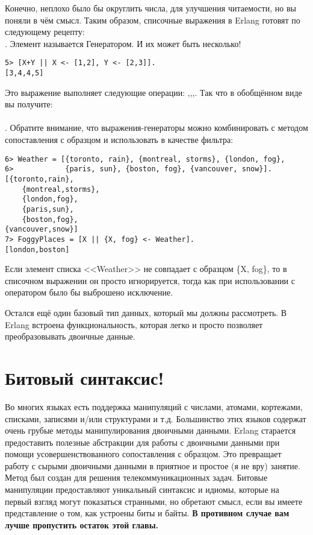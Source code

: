 Конечно, неплохо было бы округлить числа, для улучшения читаемости, но вы поняли в чём смысл.
Таким образом, списочные выражения в Erlang готовят по следующему рецепту: \ops{NewList = [Expression || Pattern}\\ 
\ops{ $<-$ List, Condition1, Condition2, ... ConditionN]}.
Элемент  называется Генератором.
И их может быть несколько!\\ 
\begin{lstlisting}[style=repl]
5> [X+Y || X <- [1,2], Y <- [2,3]].
[3,4,4,5]
\end{lstlisting}

Это выражение выполняет следующие операции: ,,,.
Так что в обобщённом виде вы получите: \\ 
\ops{[Expression || GeneratorExp1, GeneratorExp2, ..., GeneratorExpN,}\\ 
\ops{Condition1, Condition2, ... ConditionM]}.
Обратите внимание, что выражения\--генераторы можно комбинировать с методом сопоставления с образцом и использовать в качестве фильтра:
\begin{lstlisting}[style=repl]
6> Weather = [{toronto, rain}, {montreal, storms}, {london, fog},  
6>            {paris, sun}, {boston, fog}, {vancouver, snow}].
[{toronto,rain},
    {montreal,storms},
    {london,fog},
    {paris,sun},
    {boston,fog},
{vancouver,snow}]
7> FoggyPlaces = [X || {X, fog} <- Weather].
[london,boston]
\end{lstlisting}

Если элемент списка <<Weather>> не совпадает с образцом \{X, fog\}, то в списочном выражении он просто игнорируется, тогда как при использовании с оператором \ops{=} было бы выброшено исключение.

Остался ещё один базовый тип данных, который мы должны рассмотреть.
В Erlang встроена функциональность, которая легко и просто позволяет преобразовывать двоичные данные.
\section{Битовый синтаксис!}
Во многих языках есть поддержка манипуляций с числами, атомами, кортежами, списками, записями и/или структурами и т.д.
Большинство этих языков содержат очень грубые методы манипулирования двоичными данными.
Erlang старается предоставить полезные абстракции для работы с двоичными данными при помощи усовершенствованного сопоставления с образцом.
Это превращает работу с сырыми двоичными данными в приятное и простое (я не вру) занятие.
Метод был создан для решения телекоммуникационных задач.
Битовые манипуляции предоставляют уникальный синтаксис и идиомы, которые на первый взгляд могут показаться странными, но обретают смысл, если вы имеете представление о том, как устроены биты и байты.
\textbf{В противном случае вам лучше пропустить остаток этой главы.}

